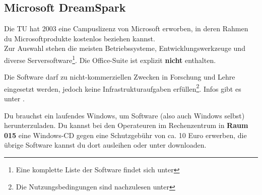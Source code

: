 \subsection{Microsoft DreamSpark}
	\label{msdnaa}
	Die TU hat  2003 eine Campuslizenz von Microsoft erworben, in deren Rahmen du Microsoftprodukte kostenlos beziehen kannst.\\ 
	Zur Auswahl stehen die meisten Betriebssysteme, Entwicklungswerkzeuge und diverse Serversoftware\footnote{\sloppy Eine komplette Liste der Software findet sich unter }. Die Office-Suite ist explizit \textbf{nicht} enthalten.

	Die Software darf zu nicht-kommerziellen Zwecken in Forschung und Lehre eingesetzt werden, jedoch keine Infrastrukturaufgaben erfüllen\footnote{Die Nutzungsbedingungen sind nachzulesen unter }. Infos gibt es unter .

	Du brauchst ein laufendes Windows, um Software (also auch
	Windows selbst) herunterzuladen. Du kannst  bei den Operateuren
	im Rechenzentrum in \textbf{Raum 015} eine Windows-CD gegen eine Schutzgebühr von ca. 10 Euro erwerben, die übrige Software kannst du dort ausleihen oder unter  downloaden.

